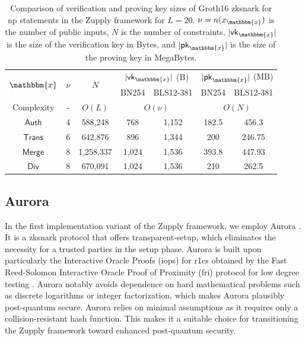 \begin{table}
 \caption[Comparison of the Groth16 key sizes for each NP statement in Zupply]{Comparison of verification and proving key sizes of Groth16 \gls{zksnark} for \gls{np} statements in the Zupply framework for $L=20$. $\nu = n(x_\mathbbm{x})$ is the number of public inputs, $N$ is the number of constraints, $|\mathsf{vk}_\mathbbm{x}|$ is the size of the verification key in Bytes, and  $|\mathsf{pk}_\mathbbm{x}|$ is the size of the proving key in MegaBytes.}
	\centering

\begin{tabular}{ccccccc}
		\toprule
		\multirow{2}{*}{\textbf{$\mathbbm{x}$}} & \multirow{2}{*}{\textbf{$\nu$}} & \multirow{2}{*}{$N$} & \multicolumn{2}{c}{$|\mathsf{vk}_\mathbbm{x}|$ (B)} & \multicolumn{2}{c}{$|\mathsf{pk}_\mathbbm{x}|$ (MB)} \\
		 &  &  & {\footnotesize BN254} & {\footnotesize BLS12-381} & {\footnotesize BN254} & {\footnotesize BLS12-381} \\
		\midrule
        Complexity & - & $O(L)$ & \multicolumn{2}{c}{$O(\nu)$}  & \multicolumn{2}{c}{$O(N)$}\\
        
		${\textsf{Auth}}$ & 4  & 588,248  & 768 & 1,152 & 182.5 & 456.3\\
		
		${\textsf{Trans}}$ & 6  & 642,876  & 896 & 1,344 & 200 & 246.75\\
		${\textsf{Merge}}$ & 8 & 1,258,337  & 1,024 & 1,536 & 393.8 & 447.93\\
		${\textsf{Div}}$ & 8 & 670,091  & 1,024 & 1,536 & 210 & 262.5\\
		\bottomrule
	\end{tabular}
	\label{tab:zksize}
\end{table}

\subsection{Aurora}

In the first implementation variant of the Zupply framework, we employ Aurora \cite{Aurora2019}. It is a \gls{zksnark} protocol  that offers transparent-setup, which eliminates the necessity for a trusted parties in the setup phase. Aurora is built upon particularly the Interactive Oracle Proofs (\gls{iop}s) \cite{Ben-Sasson2016IOP} for \gls{r1cs} obtained by the Fast Reed-Solomon Interactive Oracle Proof of Proximity (\gls{fri}) protocol for low degree testing \cite{FRI2018}. Aurora notably avoids dependence on hard mathematical problems such as discrete logarithms or integer factorization, which makes Aurora plausibly post-quantum secure. Aurora relies on minimal assumptions as it requires only a collision-resistant hash function. This makes it a suitable choice for transitioning the Zupply framework toward enhanced post-quantum security.


